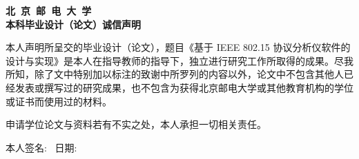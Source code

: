 \thispagestyle{empty}
\begin{center}
  {
    \bf{}\songti
    北~京~邮~电~大~学\\
    \vspace*{1em}
    本科毕业设计（论文）诚信声明
    \vspace*{2em}
  }
\end{center}

本人声明所呈交的毕业设计（论文），题目《基于 IEEE 802.15 协议分析仪软件的设计与实现》是本人在指导教师的指导下，独立进行研究工作所取得的成果。尽我所知，除了文中特别加以标注的致谢中所罗列的内容以外，论文中不包含其他人已经发表或撰写过的研究成果，也不包含为获得北京邮电大学或其他教育机构的学位或证书而使用过的材料。

申请学位论文与资料若有不实之处，本人承担一切相关责任。

\vspace*{2em}

本人签名:~\uline{\makebox[50mm]{}}
\hspace{5mm}
日期:~\uline{\makebox[50mm]{}}



